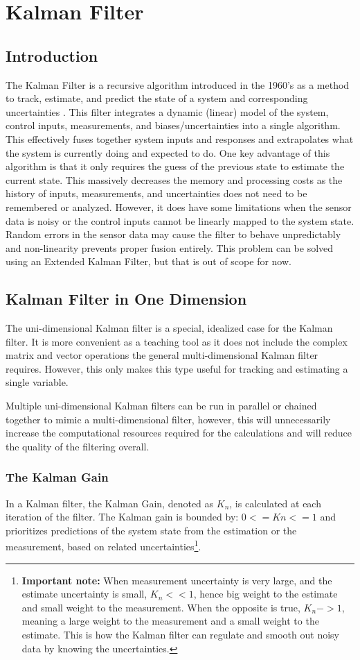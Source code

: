 \chapter{Kalman Filter} 

\section{Introduction} 
The Kalman Filter is a recursive algorithm introduced in the 1960's as a method to track, estimate, and predict the state of a system and corresponding uncertainties \cite{Kalman:1960}.
This filter integrates a dynamic (linear) model of the system, control inputs, measurements, and biases/uncertainties into a single algorithm.
This effectively fuses together system inputs and responses and extrapolates what the system is currently doing and expected to do.
One key advantage of this algorithm is that it only requires the guess of the previous state to estimate the current state. 
This massively decreases the memory and processing costs as the history of inputs, measurements, and uncertainties does not need to be remembered or analyzed.
However, it does have some limitations when the sensor data is noisy or the control inputs cannot be linearly mapped to the system state.
Random errors in the sensor data may cause the filter to behave unpredictably and non-linearity prevents proper fusion entirely.
This problem can be solved using an Extended Kalman Filter, but that is out of scope for now.

\section{Kalman Filter in One Dimension}
The uni-dimensional Kalman filter is a special, idealized case for the Kalman filter.
It is more convenient as a teaching tool as it does not include the complex matrix and vector operations the general multi-dimensional Kalman filter requires.
However, this only makes this type useful for tracking and estimating a single variable.

Multiple uni-dimensional Kalman filters can be run in parallel or chained together to mimic a multi-dimensional filter, however, this will unnecessarily increase the computational resources required for the calculations and will reduce the quality of the filtering overall.

\subsection{The Kalman Gain} 
In a Kalman filter, the Kalman Gain, denoted as $K_n$, is calculated at each iteration of the filter.
The Kalman gain is bounded by: $0 <= Kn <= 1$ and prioritizes predictions of the system state from the estimation or the measurement, based on related uncertainties\footnote{\textbf{Important note:} When measurement uncertainty is very large, and the estimate uncertainty is small, $K_n << 1$, hence big weight to the estimate and small weight to the measurement. When the opposite is true, $K_n -> 1$, meaning a large weight to the measurement and a small weight to the estimate. This is how the Kalman filter can regulate and smooth out noisy data by knowing the uncertainties.}.

